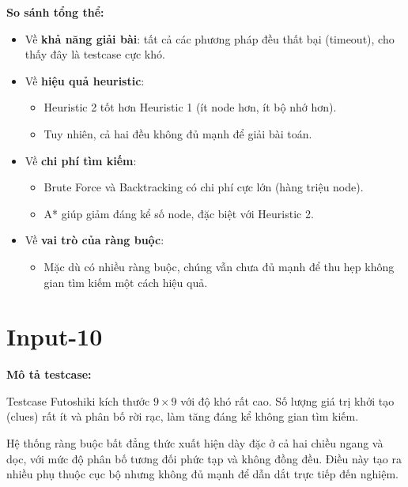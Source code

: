 \textbf{So sánh tổng thể:}

\begin{itemize}
    \item Về \textbf{khả năng giải bài}: tất cả các phương pháp đều thất bại (timeout), cho thấy đây là testcase cực khó.
    
    \item Về \textbf{hiệu quả heuristic}:
    \begin{itemize}
        \item Heuristic 2 tốt hơn Heuristic 1 (ít node hơn, ít bộ nhớ hơn).
        \item Tuy nhiên, cả hai đều không đủ mạnh để giải bài toán.
    \end{itemize}
    
    \item Về \textbf{chi phí tìm kiếm}:
    \begin{itemize}
        \item Brute Force và Backtracking có chi phí cực lớn (hàng triệu node).
        \item A* giúp giảm đáng kể số node, đặc biệt với Heuristic 2.
    \end{itemize}
    
    \item Về \textbf{vai trò của ràng buộc}:
    \begin{itemize}
        \item Mặc dù có nhiều ràng buộc, chúng vẫn chưa đủ mạnh để thu hẹp không gian tìm kiếm một cách hiệu quả.
    \end{itemize}

\end{itemize}

\section{Input-10}
\textbf{Mô tả testcase:}

Testcase Futoshiki kích thước $9 \times 9$ với độ khó rất cao. Số lượng giá trị khởi tạo (clues) rất ít và phân bố rời rạc, làm tăng đáng kể không gian tìm kiếm.

Hệ thống ràng buộc bất đẳng thức xuất hiện dày đặc ở cả hai chiều ngang và dọc, với mức độ phân bố tương đối phức tạp và không đồng đều. Điều này tạo ra nhiều phụ thuộc cục bộ nhưng không đủ mạnh để dẫn dắt trực tiếp đến nghiệm.


